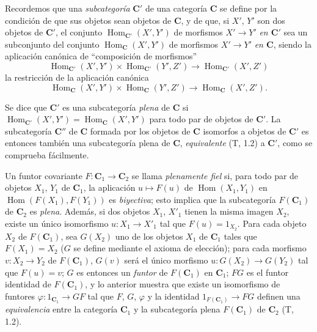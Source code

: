 \begin{env}[8.1.5]
\label{0.8.1.5}
\label{0.8.1.5-fr}
Recordemos que una \emph{subcategoría} $\boldsymbol{C}'$ de una categoría $\boldsymbol{C}$ se define por la condición de que sus objetos
sean objetos de $\boldsymbol{C}$, y de que, si $X'$, $Y'$ son dos objetos de $\boldsymbol{C}'$, el conjunto
$\operatorname{Hom}_{\mathbf{C}'}(X',Y')$ de morfismos $X'\to Y'$ \emph{en $\boldsymbol{C}'$} sea un subconjunto del conjunto $\operatorname{Hom}_{\mathbf{C}}(X',Y')$ de
morfismos $X'\to Y'$ \emph{en $\boldsymbol{C}$}, siendo la aplicación canónica de ``composición de morfismos''
\[
  \operatorname{Hom}_{\mathbf{C}'}(X',Y')\times\operatorname{Hom}_{\mathbf{C}'}(Y',Z')
  \to\operatorname{Hom}_{\mathbf{C}'}(X',Z')
\]
la restricción de la aplicación canónica
\[
  \operatorname{Hom}_{\mathbf{C}}(X',Y')\times\operatorname{Hom}_{\mathbf{C}}(Y',Z')
  \to\operatorname{Hom}_{\mathbf{C}}(X',Z').
\]

Se dice que $\boldsymbol{C}'$ es una subcategoría \emph{plena} de $\boldsymbol{C}$ si $\operatorname{Hom}_{\mathbf{C}'}(X',Y')=\operatorname{Hom}_{\mathbf{C}}(X',Y')$ para todo
par de objetos de $\boldsymbol{C}'$. La subcategoría $\boldsymbol{C}''$ de $\boldsymbol{C}$ formada por los objetos de $\boldsymbol{C}$ isomorfos a
objetos de $\boldsymbol{C}'$ es entonces también una subcategoría plena de $\boldsymbol{C}$, \emph{equivalente} (T, 1.2) a $\boldsymbol{C}'$, como se
comprueba fácilmente.

Un funtor covariante $F:\boldsymbol{C}_1\to\boldsymbol{C}_2$ se llama \emph{plenamente fiel} si, para todo par de objetos
$X_1$, $Y_1$ de $\boldsymbol{C}_1$, la aplicación $u\mapsto F(u)$ de $\operatorname{Hom}(X_1,Y_1)$ en $\operatorname{Hom}(F(X_1),F(Y_1))$ es
\emph{biyectiva}; esto implica que la subcategoría $F(\boldsymbol{C}_1)$ de $\boldsymbol{C}_2$ es \emph{plena}. Además,
si dos objetos $X_1$, $X'_1$ tienen la misma imagen $X_2$, existe un único isomorfismo
$u:X_1\to X'_1$ tal que $F(u)=1_{X_2}$. Para cada objeto $X_2$ de $F(\boldsymbol{C}_1)$, sea $G(X_2)$ uno de
los objetos $X_1$ de $\boldsymbol{C}_1$ tales que $F(X_1)=X_2$ ($G$ se define mediante el axioma de elección); para
cada morfismo $v:X_2\to Y_2$ de $F(\boldsymbol{C}_1)$, $G(v)$ será el único morfismo $u:G(X_2)\to G(Y_2)$ tal
que $F(u)=v$; $G$ es entonces un \emph{funtor} de $F(\boldsymbol{C}_1)$ en $\boldsymbol{C}_1$; $FG$ es el funtor identidad de
$F(\boldsymbol{C}_1)$, y lo anterior muestra que existe un isomorfismo de funtores $\varphi:\boldsymbol{\mathit{1}}_{\mathbf{C}_1}\to GF$
tal que $F$, $G$, $\varphi$ y la identidad $\boldsymbol{\mathit{1}}_{F(\mathbf{C}_1)}\to FG$ definen una \emph{equivalencia} entre
la categoría $\boldsymbol{C}_1$ y la subcategoría plena $F(\boldsymbol{C}_1)$ de $\boldsymbol{C}_2$ (T, 1.2).
\end{env}

